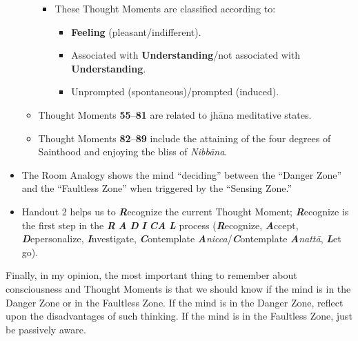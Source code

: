 \begin{itemize}
\begin{itemize}
\begin{itemize}

\item These Thought Moments are classified according to:

\begin{itemize}

\item \textbf{Feeling} (pleasant/indifferent).

\item Associated with \textbf{Understanding}/not associated with \textbf{Understanding}.

\item Unprompted (spontaneous)/prompted (induced).

\end{itemize}

\end{itemize}

\item Thought Moments \textbf{55}--\textbf{81} are related to jhāna meditative states.

\item Thought Moments \textbf{82}--\textbf{89} include the attaining of the four degrees of Sainthood and enjoying the bliss of \textit{Nibbāna}.

\end{itemize}

\item The Room Analogy shows the mind “deciding” between the “Danger Zone” and the “Faultless Zone” when triggered by the “Sensing Zone.”

\item Handout 2 helps us to \textbf{\textit{R}}ecognize the current Thought Moment; \textbf{\textit{R}}ecognize is the first step in the \textbf{\textit{R}} \textbf{\textit{A}} \textbf{\textit{D}} \textbf{\textit{I}} \textbf{\textit{CA}} \textbf{\textit{L}} process (\textbf{\textit{R}}ecognize, \textbf{\textit{A}}ccept, \textbf{\textit{D}}epersonalize, \textbf{\textit{I}}nvestigate, \textbf{\textit{C}}ontemplate \textbf{\textit{A}}\textit{nicca}/\textbf{\textit{C}}ontemplate \textbf{\textit{A}}\textit{nattā}, \textbf{\textit{L}}et go).

\end{itemize}

Finally, in my opinion, the most important thing to remember about consciousness and Thought Moments is that we should know if the mind is in the Danger Zone or in the Faultless Zone. If the mind is in the Danger Zone, reflect upon the disadvantages of such thinking. If the mind is in the Faultless Zone, just be passively aware.

